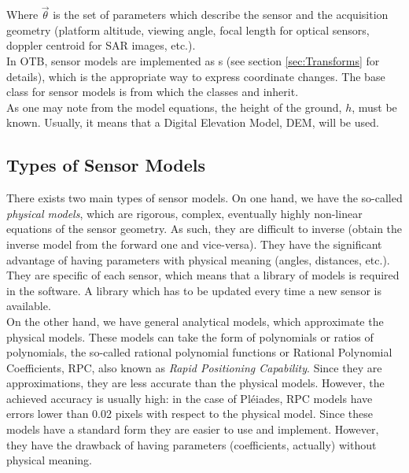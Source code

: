 Where $\vec\theta$ is the set of parameters which describe the sensor
and the acquisition geometry (platform altitude, viewing angle, focal
length for optical sensors, doppler centroid for SAR images, etc.).\\

In OTB, sensor models are implemented as s
(see section \ref{sec:Transforms} for details), which is the
appropriate way to express coordinate changes. The base class for
sensor models is  from which the classes
 and
 inherit.\\

As one may note from the model equations, the height of the ground, $h$,
must be known. Usually, it means that a Digital Elevation Model,
DEM, will be used.\\


\subsection{Types of Sensor Models}
\label{sec:TypesofSensorModels}
There exists two main types of sensor models. On one hand, we have the
so-called {\em physical models}, which are rigorous, complex,
eventually highly non-linear equations of the sensor geometry. As
such, they are difficult to inverse (obtain the inverse model from the
forward one and vice-versa). They have the significant advantage of having
parameters with physical meaning (angles, distances, etc.). They are
specific of each sensor, which means that a library of models is
required in the software. A library which has to be updated every time a new
sensor is available.\\

On the other hand, we have general analytical models, which
approximate the physical models. These models can take the form of
polynomials or ratios of polynomials, the so-called rational
polynomial functions or Rational Polynomial Coefficients, RPC, also
known as {\em Rapid Positioning Capability}.
Since they are approximations, they are less accurate than the
physical models. However, the achieved accuracy is usually high: in
the case of Pl\'eiades, RPC models have errors lower than 0.02 pixels
with respect to the physical model. Since these models have a standard
form they are easier to use and implement. However, they have the
drawback of having parameters (coefficients, actually) without
physical meaning.\\

